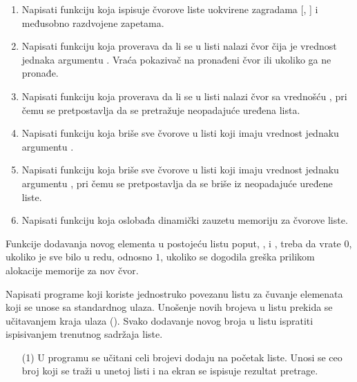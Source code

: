\begin{Exercise}[label=4_01]
\begin{enumerate}
 \item Napisati funkciju  koja ispisuje čvorove liste uokvirene zagradama [, ] i međusobno razdvojene zapetama.

 \item Napisati funkciju  koja proverava da li se u listi nalazi čvor čija je vrednost jednaka argumentu . Vraća pokazivač na pronađeni čvor ili  ukoliko ga ne pronađe.

 \item Napisati funkciju  koja proverava da li se u listi nalazi čvor sa vrednošću , pri čemu se pretpostavlja da se pretražuje neopadajuće uređena lista.

 \item Napisati funkciju  koja briše sve čvorove u listi koji imaju vrednost jednaku argumentu .

 \item Napisati funkciju  koja briše sve čvorove u listi koji imaju vrednost jednaku argumentu , pri čemu se pretpostavlja da se briše iz neopadajuće uređene liste.

 \item Napisati funkciju  koja oslobađa dinamički zauzetu memoriju za čvorove liste.
 \end{enumerate}

Funkcije dodavanja novog elementa u postojeću listu poput, ,  i , 
treba da vrate $0$, ukoliko je sve bilo u redu, odnosno $1$, ukoliko se dogodila greška prilikom alokacije memorije za nov čvor.

Napisati programe koji koriste jednostruko povezanu listu za čuvanje elemenata koji se unose sa standardnog ulaza.  Unošenje novih brojeva u listu prekida se učitavanjem kraja ulaza (). Svako dodavanje novog broja u listu ispratiti ispisivanjem trenutnog sadržaja liste. 

\begin{enumerate}
\item[(1)] U programu se učitani celi brojevi dodaju na početak liste. 
    Unosi se ceo broj koji se traži u unetoj listi i na ekran se ispisuje rezultat pretrage. 


\end{enumerate}
\end{Exercise}
